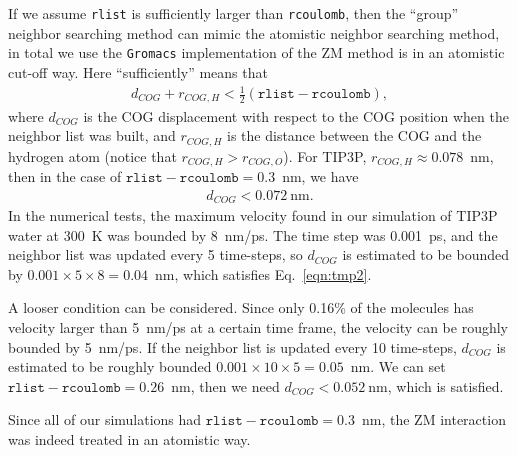 \documentclass[aps,pre,preprint]{revtex4-1}
\newcommand{\gromacs}[0]{\texttt{Gromacs}}
\newcommand{\rlist}[0]{\texttt{rlist}}
\newcommand{\rcoulomb}[0]{\texttt{rcoulomb}}
\begin{document}
If we assume \rlist{} is sufficiently larger than \rcoulomb{}, then
the ``group'' neighbor searching method can mimic the atomistic
neighbor searching method, in total we use the \gromacs{}
implementation of the ZM method is in an atomistic cut-off way.
Here ``sufficiently'' means that
\begin{align}
  d_{COG} + r_{COG,H} < \frac12 (\rlist - \rcoulomb),
\end{align}
where $d_{COG}$ is the COG displacement with respect to the COG position
when the neighbor list was built, and $r_{COG,H}$ is the distance between
the COG and the hydrogen atom (notice that  $r_{COG,H} >  r_{COG,O}$).
For TIP3P, $r_{COG,H}\approx 0.078$~nm, then
in the case of $\rlist - \rcoulomb = 0.3$~nm, we have
\begin{align}\label{eqn:tmp2}
  d_{COG} < 0.072\ \textrm{nm}.
\end{align}
In the numerical tests, the maximum velocity found in our simulation
of TIP3P water at 300~K was bounded by 8~nm/ps. The time step was
0.001~ps, and the neighbor list was updated every 5 time-steps, so
$d_{COG}$ is estimated to be bounded by $0.001 \times 5 \times 8 = 0.04$~nm,
which satisfies Eq.~\eqref{eqn:tmp2}.

A looser condition can be considered. Since only 0.16\% of the molecules
has velocity larger than 5~nm/ps at a certain time frame, the velocity can be
roughly bounded by  5~nm/ps.
If the neighbor list is updated every 10 time-steps, 
$d_{COG}$ is estimated to be roughly bounded $0.001 \times 10 \times 5 = 0.05$~nm.
We can set  $\rlist - \rcoulomb = 0.26$~nm, then we need $d_{COG} < 0.052\ \textrm{nm}$, which is satisfied.

Since all of our simulations had $\rlist - \rcoulomb = 0.3$~nm, the ZM
interaction was indeed treated in an atomistic way.





\end{document}
